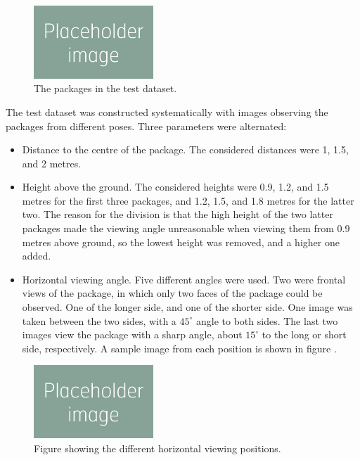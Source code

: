 

\begin{figure}
\begin{center}
\includegraphics[width=0.4\textwidth]{figures/placeholder.png}
\end{center}
\caption{The packages in the test dataset.}
\label{fig:packages}
\end{figure}

The test dataset was constructed systematically with images observing the packages from different poses. %
Three parameters were alternated: 
\begin{itemize}
	\item Distance to the centre of the package. 
			The considered distances were 1, 1.5, and 2 metres.
	\item Height above the ground. 
			The considered heights were 0.9, 1.2, and 1.5 metres for the first three packages, and 1.2, 1.5, and 1.8 metres for the latter two.
			The reason for the division is that the high height of the two latter packages made the viewing angle unreasonable when viewing them from 0.9 metres above ground, so the lowest height was removed, and a higher one added.
	\item Horizontal viewing angle. 
			Five different angles were used.
			Two were frontal views of the package, in which only two faces of the package could be observed. One of the longer side, and one of the shorter side.
			One image was taken between the two sides, with a $45^\circ$ angle to both sides.
			The last two images view the package with a sharp angle, about $15^\circ$ to the long or short side, respectively.
			A sample image from each position is shown in figure \label{fig:positions}.
\end{itemize}

\begin{figure}
\begin{center}
\includegraphics[width=0.4\textwidth]{figures/placeholder.png}
\end{center}
\caption{Figure showing the different horizontal viewing positions.}
\label{fig:positions}
\end{figure}

